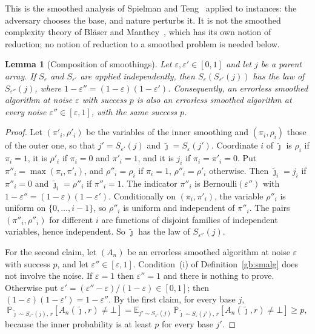 \documentclass[11pt]{amsart}
\newtheorem{lemma}[theorem]{Lemma}
\theoremstyle{definition}
\theoremstyle{remark}
\newcommand{\eps}{\varepsilon}
\newcommand{\jt}{\tilde{\jmath}}
\newcommand{\PP}{\mathbb{P}}
\newcommand{\EE}{\mathbb{E}}
\begin{document}
This is the smoothed analysis of Spielman and
Teng~\cite{gb-spielmanteng} applied to instances: the adversary chooses the
base, and nature perturbs it. It is not the smoothed complexity theory of
Bl\"aser and Manthey~\cite{gb-blasermanthey}, which has its own notion of
reduction; no notion of reduction to a smoothed problem is needed below.

\begin{lemma}[Composition of smoothings]\label{gb:comp}
Let $\eps,\eps'\in[0,1]$ and let $j$ be a parent array. If $S_\eps$ and
$S_{\eps'}$ are applied independently, then $S_\eps(S_{\eps'}(j))$ has the
law of $S_{\eps''}(j)$, where $1-\eps''=(1-\eps)(1-\eps')$. Consequently, an
errorless smoothed algorithm at noise $\eps$ with success $p$ is also an
errorless smoothed algorithm at every noise $\eps''\in[\eps,1]$, with the
same success $p$.
\end{lemma}

\begin{proof}
Let $(\pi'_i,\rho'_i)$ be the variables of the inner smoothing and
$(\pi_i,\rho_i)$ those of the outer one, so that $j'=S_{\eps'}(j)$ and
$\jt=S_\eps(j')$. Coordinate $i$ of $\jt$ is $\rho_i$ if $\pi_i=1$, it is
$\rho'_i$ if $\pi_i=0$ and $\pi'_i=1$, and it is $j_i$ if $\pi_i=\pi'_i=0$.
Put $\pi''_i=\max(\pi_i,\pi'_i)$, and $\rho''_i=\rho_i$ if $\pi_i=1$,
$\rho''_i=\rho'_i$ otherwise. Then $\jt_i=j_i$ if $\pi''_i=0$ and
$\jt_i=\rho''_i$ if $\pi''_i=1$. The indicator $\pi''_i$ is
Bernoulli$(\eps'')$ with $1-\eps''=(1-\eps)(1-\eps')$. Conditionally on
$(\pi_i,\pi'_i)$, the variable $\rho''_i$ is uniform on $\{0,\dots,i-1\}$, so
$\rho''_i$ is uniform and independent of $\pi''_i$. The pairs
$(\pi''_i,\rho''_i)$ for different $i$ are functions of disjoint families of
independent variables, hence independent. So $\jt$ has the law of
$S_{\eps''}(j)$.

For the second claim, let $(A_n)$ be an errorless smoothed algorithm at
noise $\eps$ with success $p$, and let $\eps''\in[\eps,1]$. Condition~(i) of
Definition~\ref{gb:smalg} does not involve the noise. If $\eps=1$ then
$\eps''=1$ and there is nothing to prove. Otherwise put
$\eps'=(\eps''-\eps)/(1-\eps)\in[0,1]$; then $(1-\eps)(1-\eps')=1-\eps''$.
By the first claim, for every base $j$,
\[
\PP_{\jt\sim S_{\eps''}(j),\,r}[A_n(\jt,r)\ne\bot]
=\EE_{j'\sim S_{\eps'}(j)}\,
\PP_{\jt\sim S_\eps(j'),\,r}[A_n(\jt,r)\ne\bot]\ge p,
\]
because the inner probability is at least $p$ for every base $j'$.
\end{proof}
\end{document}
